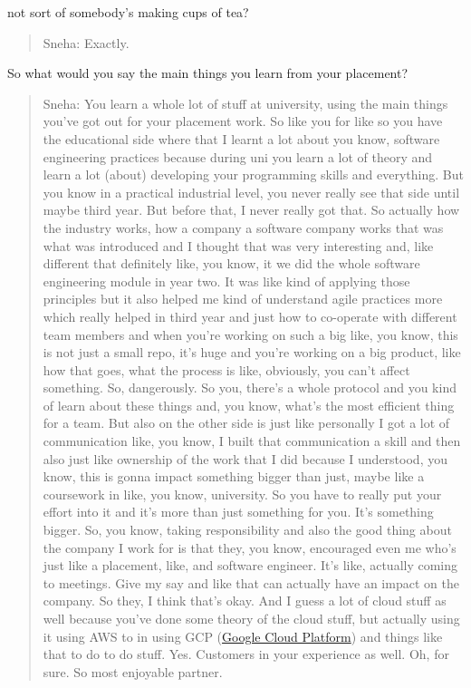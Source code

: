\documentclass[
]{book}
\begin{document}
not sort of somebody's making cups of tea?

\begin{quote}
Sneha: Exactly.
\end{quote}

So what would you say the main things you learn from your placement?

\begin{quote}
Sneha: You learn a whole lot of stuff at university, using the main things you've got out for your placement work. So like you for like so you have the educational side where that I learnt a lot about you know, software engineering practices because during uni you learn a lot of theory and learn a lot (about) developing your programming skills and everything. But you know in a practical industrial level, you never really see that side until maybe third year. But before that, I never really got that. So actually how the industry works, how a company a software company works that was what was introduced and I thought that was very interesting and, like different that definitely like, you know, it we did the whole software engineering module in year two. It was like kind of applying those principles but it also helped me kind of understand agile practices more which really helped in third year and just how to co-operate with different team members and when you're working on such a big like, you know, this is not just a small repo, it's huge and you're working on a big product, like how that goes, what the process is like, obviously, you can't affect something. So, dangerously. So you, there's a whole protocol and you kind of learn about these things and, you know, what's the most efficient thing for a team. But also on the other side is just like personally I got a lot of communication like, you know, I built that communication a skill and then also just like ownership of the work that I did because I understood, you know, this is gonna impact something bigger than just, maybe like a coursework in like, you know, university. So you have to really put your effort into it and it's more than just something for you. It's something bigger. So, you know, taking responsibility and also the good thing about the company I work for is that they, you know, encouraged even me who's just like a placement, like, and software engineer. It's like, actually coming to meetings. Give my say and like that can actually have an impact on the company. So they, I think that's okay. And I guess a lot of cloud stuff as well because you've done some theory of the cloud stuff, but actually using it using AWS to in using GCP (\href{https://en.wikipedia.org/wiki/Google_Cloud_Platform}{Google Cloud Platform}) and things like that to do to do stuff. Yes. Customers in your experience as well. Oh, for sure. So most enjoyable partner.
\end{quote}
\end{document}
